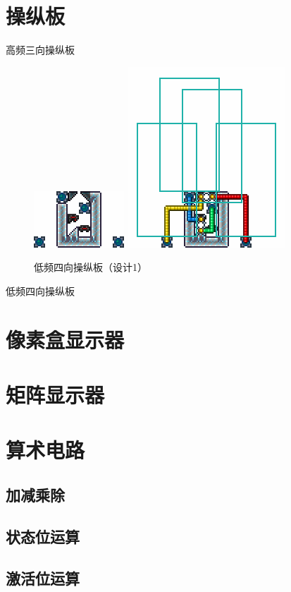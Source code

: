\section{操纵板}
高频三向操纵板

\begin{figure}
    \centering
    \includegraphics{images/253.png}
    \qquad
    \includegraphics{images/254.png}
    \caption{低频四向操纵板（设计1）}
\end{figure}
低频四向操纵板

\section{像素盒显示器}

\section{矩阵显示器}

\section{算术电路}
\subsection{加减乘除}
\subsection{状态位运算}
\subsection{激活位运算}
